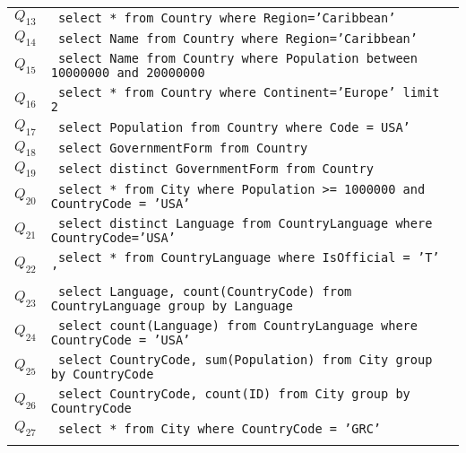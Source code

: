 \begin{table}
\begin{tabular}{l|L{12cm}}
		$Q_{13}$ & \texttt{
			select * from Country where Region='Caribbean' 
		} \\ \hdashline
		
		$Q_{14}$ & \texttt{
			select Name from Country where Region='Caribbean'
		}\\
		
		$Q_{15}$ & \texttt{
			select Name from Country where Population between 10000000 and 20000000
		} \\ \hdashline
		
		$Q_{16}$ & \texttt{
			select * from Country where Continent='Europe' limit 2
		} \\ \hdashline
		
		$Q_{17}$ & \texttt{
			select Population from Country where Code = USA'
		} \\ \hdashline
		
		$Q_{18}$ & \texttt{
			select GovernmentForm from Country
		} \\ \hdashline
		
		$Q_{19}$ & \texttt{
			select distinct GovernmentForm from Country
		} \\ \hdashline
		
		$Q_{20}$ & \texttt{
			select * from City where Population >= 1000000 and CountryCode = 'USA' 
		} \\ \hdashline
		
		$Q_{21}$ & \texttt{
			select distinct Language from CountryLanguage where CountryCode='USA'
		} \\ \hdashline
		
		$Q_{22}$ & \texttt{
			select * from CountryLanguage where IsOfficial = 'T'
			'} \\ \hdashline
		
		$Q_{23}$ & \texttt{
			select Language, count(CountryCode) from CountryLanguage group by Language
		} \\ \hdashline
		
		$Q_{24}$ & \texttt{
			select count(Language) from CountryLanguage where CountryCode = 'USA'
		} \\ \hdashline
		
		$Q_{25}$ & \texttt{
			select CountryCode, sum(Population) from City group by CountryCode 
		} \\ \hdashline
		
		$Q_{26}$ & \texttt{
			select CountryCode, count(ID) from City group by CountryCode 
		} \\ \hdashline
		
		$Q_{27}$ & \texttt{
			select * from City where CountryCode = 'GRC'
		} \\ \hdashline
		

\end{tabular}
\end{table}
